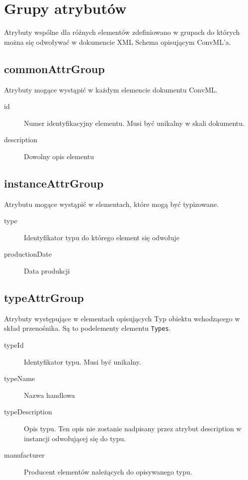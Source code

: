 \documentclass[12pt,a4paper]{article}
\begin{document}
\section{Grupy atrybutów}
Atrybuty wspólne dla różnych elementów zdefiniowano w grupach do których można
się odwoływać w dokumencie XML Schema opisującym ConvML'a.

\subsection{commonAttrGroup}
Atrybuty mogące wystąpić w każdym elemencie dokumentu ConvML.

\begin{description}
\item[id] Numer identyfikacyjny elementu. Musi być unikalny w skali dokumentu.
\item[description] Dowolny opis elementu
\end{description}

\subsection{instanceAttrGroup}
Atrybutu mogące wystąpić w elementach, które mogą być typizowane.

\begin{description}
\item[type] Identyfikator typu do którego element się odwołuje
\item[productionDate] Data produkcji 
\end{description}

\subsection{typeAttrGroup}
Atrybuty występujące w elementach opisujących Typ obiektu wchodzącego w skład
przenośnika.  Są to podelementy elementu {\tt Types}.

\begin{description}
\item[typeId] Identyfikator typu. Musi być unikalny.
\item[typeName] Nazwa handlowa
\item[typeDescription] Opis typu. Ten opis nie zostanie nadpisany przez atrybut
  description w instancji odwołującej się do typu.
\item[manufacturer] Producent elementów należących do opisywanego typu. 
\end{description}
\end{document}
